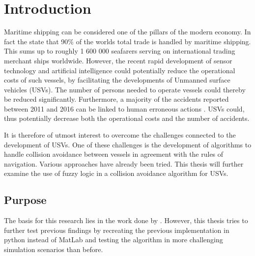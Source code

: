 

\chapter{Introduction} %

\label{Introduction} %


\newcommand{\keyword}[1]{\textbf{#1}}
\newcommand{\tabhead}[1]{\textbf{#1}}
\newcommand{\code}[1]{\texttt{#1}}
\newcommand{\file}[1]{\texttt{\bfseries#1}}
\newcommand{\option}[1]{\texttt{\itshape#1}}


Maritime shipping can be considered one of the pillars of the modern economy. In fact the \textcite{percent_trade} state that 90\% of the worlds total trade is handled by maritime shipping. This sums up to roughly 1 600 000 seafarers serving on international trading merchant ships worldwide. However, the recent rapid development of sensor technology and artificial intelligence could potentially reduce the operational costs of such vessels, by facilitating the developments of  Unmanned surface vehicles (USVs). The number of persons needed to operate vessels could thereby be reduced significantly. Furthermore, a majority of the accidents reported between 2011 and 2016 can be linked to human erroneous actions \cite{marine_casualities_incidents_2017}. USVs could, thus potentially decrease both the operational costs and the number of accidents.

It is therefore of utmost interest to overcome the challenges connected to the development of USVs. One of these challenges  is the development of algorithms to handle collision avoidance between vessels in agreement with the rules of navigation. Various approaches have already been tried. This thesis will further examine the use of  fuzzy logic in a collision avoidance algorithm for USVs.
\section{Purpose}
The basis for this research lies in the work done by \textcite{perera2012intelligent}. However, this thesis tries to further test previous findings by recreating the previous implementation in python instead of MatLab and testing the algorithm in more challenging simulation scenarios than before.

